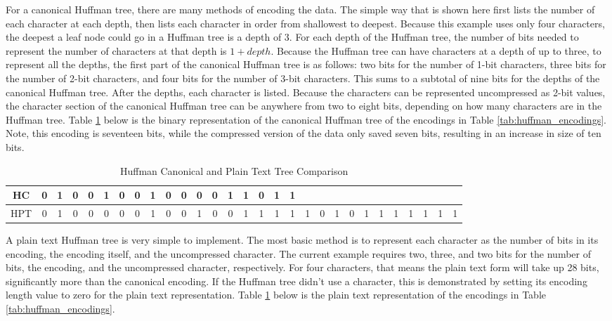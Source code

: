 \documentclass[doublespace,nopageskip]{VTthesis}
\begin{document}
For a canonical Huffman tree, there are many methods of encoding the data. The simple way that is shown here first lists the number of each character at each depth, then lists each character in order from shallowest to deepest. Because this example uses only four characters, the deepest a leaf node could go in a Huffman tree is a depth of 3. For each depth of the Huffman tree, the number of bits needed to represent the number of characters at that depth is $1+depth$. Because the Huffman tree can have characters at a depth of up to three, to represent all the depths, the first part of the canonical Huffman tree is as follows: two bits for the number of 1-bit characters, three bits for the number of 2-bit characters, and four bits for the number of 3-bit characters. This sums to a subtotal of nine bits for the depths of the canonical Huffman tree. After the depths, each character is listed. Because the characters can be represented uncompressed as 2-bit values, the character section of the canonical Huffman tree can be anywhere from two to eight bits, depending  on how many characters are in the Huffman tree. Table \ref{tab:huffman_canonical_and_plain_text_comparison} below is the binary representation of the canonical Huffman tree of the encodings in Table \ref{tab:huffman_encodings}. Note, this encoding is seventeen bits, while the compressed version of the data only saved seven bits, resulting in an increase in size of ten bits.

\begin{table}[htb]
	\centering
	\caption{Huffman Canonical and Plain Text Tree Comparison}
	\begin{tabular}{ccccccccccccccccccccccccccccc}
	    \toprule
	    HC & 0 & 1 & 0 & 0 & 1 & 0 & 0 & 1 & 0 & 0 & 0 & 0 & 1 & 1 & 0 & 1 & 1 & & & & & & & & & & \\
	    \midrule
	    HPT & 0 & 1 & 0 & 0 & 0 & 0 & 0 & 1 & 0 & 0 & 1 & 0 & 0 & 1 & 1 & 1 & 1 & 1 & 0 & 1 & 0 & 1 & 1 & 1 & 1 & 1 & 1 & 1 \\
	    \bottomrule
	\end{tabular}
	\label{tab:huffman_canonical_and_plain_text_comparison}
\end{table}

A plain text Huffman tree is very simple to implement. The most basic method is to represent each character as the number of bits in its encoding, the encoding itself, and the uncompressed character. The current example requires two, three, and two bits for the number of bits, the encoding, and the uncompressed character, respectively. For four characters, that means the plain text form will take up 28 bits, significantly more than the canonical encoding. If the Huffman tree didn't use a character, this is demonstrated by setting its encoding length value to zero for the plain text representation. Table \ref{tab:huffman_canonical_and_plain_text_comparison} below is the plain text representation of the encodings in Table \ref{tab:huffman_encodings}.
\end{document}

